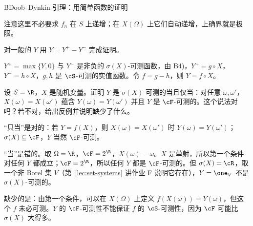 \begin{probleme}{B}{Doob--Dynkin 引理：用简单函数的证明}
\begin{questions}
\begin{solution}
注意这里不必要求 $f_n$ 在 $S$ 上递增；在 $X(\Omega)$ 上它们自动递增，上确界就是极限。
\end{solution}
\item 对一般的 $Y$ 用 $Y=Y^+-Y^-$ 完成证明。
\begin{solution}
$Y^+=\max\{Y,0\}$ 与 $Y^-$ 是非负的 $\sigma(X)$-可测函数，由 B4)，$Y^+=g\circ X$，$Y^-=h\circ X$，$g,h$ 是 $\cS$-可测的实值函数。令 $f=g-h$，则 $Y=f\circ X$。
\end{solution}
\item 设 $S=\R$，$X$ 是随机变量。证明 $Y$ 是 $\sigma(X)$-可测的当且仅当：对任意 $\omega,\omega'$，$X(\omega)=X(\omega')$ 蕴含 $Y(\omega)=Y(\omega')$ 并且 $Y$ 是 $\cF$-可测的。这个说法对吗？若不对，给出反例并说明缺少了什么。
\begin{solution}
“只当”是对的：若 $Y=f(X)$，则 $X(\omega)=X(\omega')$ 时 $Y(\omega)=Y(\omega')$；$\sigma(X)\subseteq\cF$，$Y$ 当然 $\cF$-可测。

“当”是错的。取 $\Omega=\R$，$\cF=2^\R$，$X(\omega)=\omega$。$X$ 是单射，所以第一个条件对任何 $Y$ 都成立；$\cF=2^\R$，所以任何 $Y$ 都是 $\cF$-可测的。但 $\sigma(X)=\cR$，取一个非 Borel 集 $V$（第~\ref{lec:set-systems} 讲作业 F 说明它存在），$Y=\one_V$ 不是 $\sigma(X)$-可测的。

缺少的是：由第一个条件，可以在 $X(\Omega)$ 上定义 $f(X(\omega))=Y(\omega)$，但这个 $f$ 未必可测。$Y$ 的 $\cF$-可测性不能保证 $f$ 的 $\cS$-可测性，因为 $\cF$ 可能比 $\sigma(X)$ 大得多。
\end{solution}
\end{questions}
\end{probleme}


